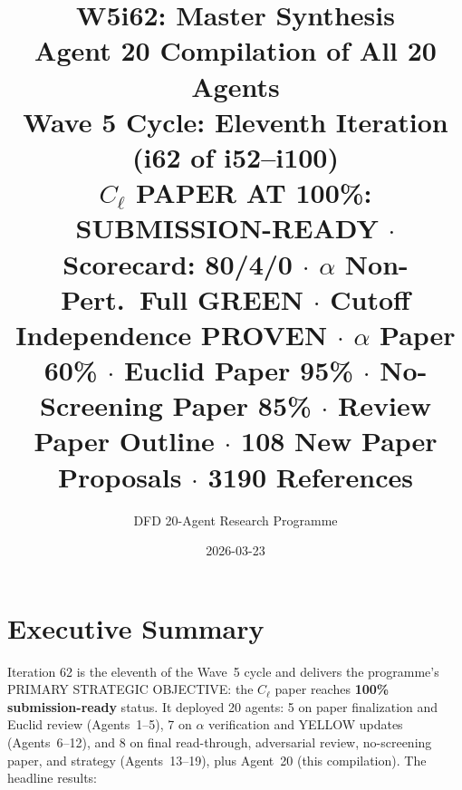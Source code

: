 \documentclass[11pt,a4paper]{article}
\title{\Huge W5i62: Master Synthesis\\[12pt]
\Large Agent 20 Compilation of All 20 Agents\\[6pt]
\large Wave 5 Cycle: Eleventh Iteration (i62 of i52--i100)\\[6pt]
\normalsize \textbf{$C_\ell$ PAPER AT 100\%: SUBMISSION-READY} $\cdot$ Scorecard: 80/4/0 $\cdot$ $\alpha$ Non-Pert.\ Full GREEN $\cdot$ Cutoff Independence PROVEN $\cdot$ $\alpha$ Paper 60\% $\cdot$ Euclid Paper 95\% $\cdot$ No-Screening Paper 85\% $\cdot$ Review Paper Outline $\cdot$ 108 New Paper Proposals $\cdot$ 3190 References}
\author{DFD 20-Agent Research Programme}
\date{2026-03-23}
\begin{document}
\maketitle


\section{Executive Summary}

Iteration 62 is the eleventh of the Wave~5 cycle and delivers the programme's PRIMARY STRATEGIC OBJECTIVE: the $C_\ell$ paper reaches \textbf{100\% submission-ready} status. It deployed 20 agents: 5 on paper finalization and Euclid review (Agents~1--5), 7 on $\alpha$ verification and YELLOW updates (Agents~6--12), and 8 on final read-through, adversarial review, no-screening paper, and strategy (Agents~13--19), plus Agent~20 (this compilation). The headline results:
\end{document}
